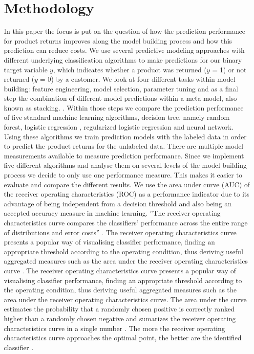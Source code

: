 \documentclass[12pt]{article}
\begin{document}
\section{Methodology}
In this paper the focus is put on the question of how the prediction performance for product returns improves along the model building process and how this prediction can reduce costs. We use several predictive modeling approaches with different underlying classification algorithms to make predictions for our binary target variable $y$, which indicates whether a product was returned ($y$ = 1) or not returned ($y$ = 0) by a customer.
We look at four different tasks within model building: feature engineering, model selection, parameter tuning and as a final step the combination of different model predictions within a meta model, also known as stacking.  \cite{WinNT1}.
Within those steps we compare the prediction performance of five standard machine learning algorithms, decision tree, namely random forest,  logistic regression , regularized logistic regression and neural network. Using these algorithms we train prediction models with the labeled data in order to predict the product returns for the unlabeled data. There are multiple model measurements available to measure prediction performance.
Since we implement five different algorithms and analyse them on several levels of the model building process we decide to only use one performance measure. This makes it easier to evaluate and compare the different results. We use the area under curve (AUC) of the receiver operating characteristics (ROC) as a performance indicator due to its advantage of being independent from a decision threshold and also being an accepted accuracy measure in machine learning. ''The receiver operating characteristics curve compares the classifiers’ performance across the entire range of distributions and error costs'' \cite{ling2003auc}. The receiver operating characteristics curve presents a popular way of visualising classifier performance, finding an appropriate threshold according to the operating condition, thus deriving useful aggregated measures such as the area under the receiver operating characteristics curve \cite{metz1978basic}. The receiver operating characteristics curve presents a popular way of visualising classifier performance, finding an appropriate threshold according to the operating condition, thus deriving useful aggregated measures such as the area under the receiver operating characteristics curve. The area under the curve estimates the probability that a randomly chosen positive is correctly ranked higher than a randomly chosen negative and sumarizes the receiver operating characteristics curve in a single number \cite{metz1978basic}. The more the receiver operating characteristics curve approaches the optimal point, the better are the identified classifier \cite{lessmann2015benchmarking}.
\end{document}
